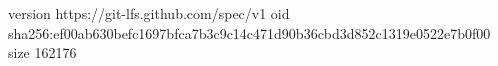 version https://git-lfs.github.com/spec/v1
oid sha256:ef00ab630befc1697bfca7b3c9c14c471d90b36cbd3d852c1319e0522e7b0f00
size 162176
